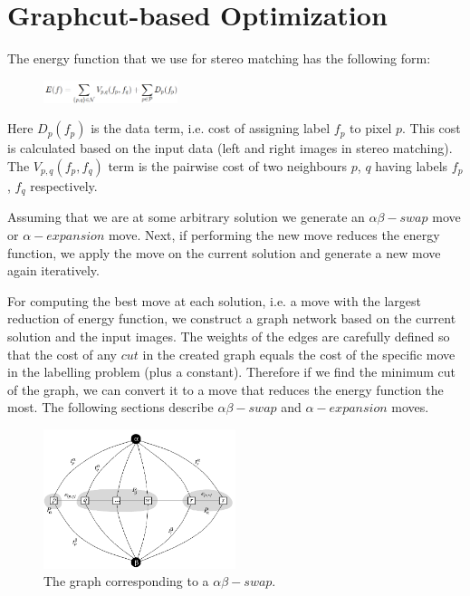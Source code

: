 \documentclass[letterpaper, 10 pt, conference]{ieeeconf}  %
\begin{document}
\section{Graphcut-based Optimization}
\label{graphcut}
The energy function that we use for stereo matching has the following form:
\begin{figure}[h]
                \centering
                \includegraphics[width=0.35\textwidth]{imgs/energy.png}
                \label{fig:farm}
\end{figure}

Here $D_p(f_p)$ is the data term, i.e. cost of assigning label $f_p$ to pixel $p$. This cost is calculated based on the input data (left and right images in stereo matching). The $V_{p,q}(f_p,f_q)$ term is the pairwise cost of two neighbours $p$, $q$ having labels $f_p$, $f_q$ respectively. 

Assuming that we are at some arbitrary solution we generate an $\alpha\beta-swap$ move or $\alpha-expansion$ move. Next, if performing the new move reduces the energy function, we apply the move on the current solution and generate a new move again iteratively. 

For computing the best move at each solution, i.e. a move with the largest reduction of energy function, we construct a graph network based on the current solution and the input images. The weights of the edges are carefully defined so that the cost of any $cut$ in the created graph equals the cost of the specific move in the labelling problem (plus a constant). Therefore if we find the minimum cut of the graph, we can convert it to a move that reduces the energy function the most.  The following sections describe $\alpha\beta-swap$ and $\alpha-expansion$ moves.

\begin{figure}[h]
                \centering
                \includegraphics[width=0.5\textwidth]{imgs/swap.png}
                \caption{The graph corresponding to a $\alpha\beta-swap$.}
                \label{abswap}
\end{figure}
\end{document}
